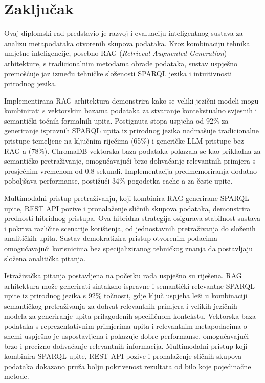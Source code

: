 \chapter{Zaključak}
\label{ch:conclusion}


Ovaj diplomski rad predstavio je razvoj i evaluaciju inteligentnog sustava za analizu metapodataka otvorenih skupova podataka. Kroz kombinaciju tehnika umjetne inteligencije, posebno RAG (\textit{Retrieval-Augmented Generation}) arhitekture, s tradicionalnim metodama obrade podataka, sustav uspješno premošćuje jaz između tehničke složenosti SPARQL jezika i intuitivnosti prirodnog jezika.

Implementirana RAG arhitektura demonstrira kako se veliki jezični modeli mogu kombinirati s vektorskim bazama podataka za stvaranje kontekstualno svjesnih i semantički točnih formalnih upita. Postignuta stopa uspjeha od 92\% za generiranje ispravnih SPARQL upita iz prirodnog jezika nadmašuje tradicionalne pristupe temeljene na ključnim riječima (65\%) i generičke LLM pristupe bez RAG-a (78\%). ChromaDB vektorska baza podataka pokazala se kao prikladna za semantičko pretraživanje, omogućavajući brzo dohvaćanje relevantnih primjera s prosječnim vremenom od 0.8 sekundi. Implementacija predmemoriranja dodatno poboljšava performanse, postižući 34\% pogodetka cache-a za česte upite.

Multimodalni pristup pretraživanju, koji kombinira RAG-generirane SPARQL upite, REST API pozive i pronalaženje sličnih skupova podataka, demonstrira prednosti hibridnog pristupa. Ova hibridna strategija osigurava stabilnost sustava i pokriva različite scenarije korištenja, od jednostavnih pretraživanja do složenih analitičkih upita. Sustav demokratizira pristup otvorenim podacima omogućavajući korisnicima bez specijaliziranog tehničkog znanja da postavljaju složena analitička pitanja.

Istraživačka pitanja postavljena na početku rada uspješno su riješena. RAG arhitektura može generirati sintaksno ispravne i semantički relevantne SPARQL upite iz prirodnog jezika s 92\% točnosti, gdje ključ uspjeha leži u kombinaciji semantičkog pretraživanja za dohvat relevantnih primjera i velikih jezičnih modela za generiranje upita prilagođenih specifičnom kontekstu. Vektorska baza podataka s reprezentativnim primjerima upita i relevantnim metapodacima o shemi uspješno je uspostavljena i pokazuje dobre performanse, omogućavajući brzo i precizno dohvaćanje relevantnih informacija. Multimodalni pristup koji kombinira SPARQL upite, REST API pozive i pronalaženje sličnih skupova podataka dokazano pruža bolju pokrivenost rezultata od bilo koje pojedinačne metode.

